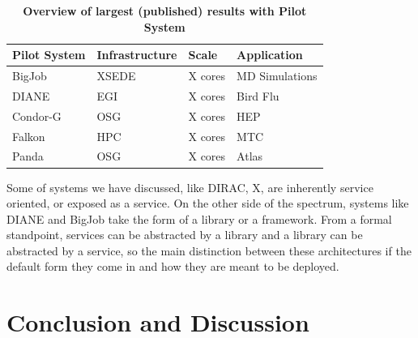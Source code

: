 \documentclass{sig-alternate}
\begin{document}
\begin{table}
 \centering
 \begin{tabular}{|p{3cm}|p{3.0cm}|p{2.0cm}|p{3.0cm}|}
  \hline
    \textbf{Pilot System} & \textbf{Infrastructure} & \textbf{Scale}  &
    \textbf{Application}\\
  \hline
  \hline
    BigJob & XSEDE & X cores & MD Simulations \cite{} \\
  \hline
    DIANE & EGI & X cores & Bird Flu \cite{} \\
  \hline
    Condor-G & OSG & X cores & HEP \cite{} \\
  \hline
    Falkon & HPC & X cores & MTC \cite{} \\
  \hline
    Panda & OSG & X cores & Atlas \cite{} \\
  \hline
 \end{tabular}
 \caption{\textbf{Overview of largest (published) results with Pilot System}}
 \label{table:scale}
\end{table}

Some of systems we have discussed, like DIRAC, X, are inherently service
oriented, or exposed as a service.
On the other side of the spectrum, systems like DIANE and BigJob take the form
of a library or a framework.
From a formal standpoint, services can be abstracted by a library and a library
can be abstracted by a service, so the main distinction between these
architectures if the default form they come in and how they are meant to be
deployed.

\section{Conclusion and Discussion}
\label{sec:5}

\end{document}
